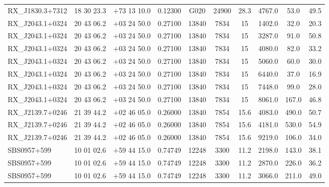 \begin{landscape}
\begin{center}
\begin{longtable}{l c c c c c c c c c}
RX\_J1830.3+7312  &        18 30 23.3  &         $+$73 13 10.0  &       0.12300  & G020  &    24900  &      28.3  &      4767.0  &  53.0  &   49.5  \\
RX\_J2043.1+0324  &        20 43 06.2  &         $+$03 24 50.0  &       0.27100  & 13840  &   7834  &       15  &        1402.0  &  32.0  &   20.3  \\
RX\_J2043.1+0324  &        20 43 06.2  &         $+$03 24 50.0  &       0.27100  & 13840  &   7834  &       15  &        3287.0  &  91.0  &   50.8  \\
RX\_J2043.1+0324  &        20 43 06.2  &         $+$03 24 50.0  &       0.27100  & 13840  &   7834  &       15  &        4080.0  &  82.0  &   33.2  \\
RX\_J2043.1+0324  &        20 43 06.2  &         $+$03 24 50.0  &       0.27100  & 13840  &   7834  &       15  &        5060.0  &  60.0  &   30.0  \\
RX\_J2043.1+0324  &        20 43 06.2  &         $+$03 24 50.0  &       0.27100  & 13840  &   7834  &       15  &        6440.0  &  37.0  &   16.9  \\
RX\_J2043.1+0324  &        20 43 06.2  &         $+$03 24 50.0  &       0.27100  & 13840  &   7834  &       15  &        7448.0  &  99.0  &   28.0  \\
RX\_J2043.1+0324  &        20 43 06.2  &         $+$03 24 50.0  &       0.27100  & 13840  &   7834  &       15  &        8061.0  &  167.0  &  46.8  \\
RX\_J2139.7+0246  &        21 39 44.2  &         $+$02 46 05.0  &       0.26000  & 13840  &   7854  &       15.6  &      4083.0  &  490.0  &  50.7  \\
RX\_J2139.7+0246  &        21 39 44.2  &         $+$02 46 05.0  &       0.26000  & 13840  &   7854  &       15.6  &      4181.0  &  530.0  &  54.9  \\
RX\_J2139.7+0246  &        21 39 44.2  &         $+$02 46 05.0  &       0.26000  & 13840  &   7854  &       15.6  &      9219.0  &  106.0  &  34.0  \\
SBS0957+599  &             10 01 02.6  &         $+$59 44 15.0  &       0.74749  & 12248  &   3300  &       11.2  &      2198.0  &  143.0  &  38.1  \\
SBS0957+599  &             10 01 02.6  &         $+$59 44 15.0  &       0.74749  & 12248  &   3300  &       11.2  &      2870.0  &  226.0  &  36.2  \\
SBS0957+599  &             10 01 02.6  &         $+$59 44 15.0  &       0.74749  & 12248  &   3300  &       11.2  &      3066.0  &  211.0  &  49.0  \\

\end{longtable}
\end{center}
\end{landscape}
